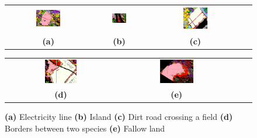 \documentclass{siamart171218}
\begin{document}
\begin{figure} [H]
    \centering
    \begin{tabular}{cccc}
        \includegraphics[width=0.3\textwidth]{images/electric_line.png} &
        \includegraphics[width=0.3\textwidth]{images/island_rejected.png} &
        \includegraphics[width=0.3\textwidth]{images/field_rejected.png} \\
        \textbf{(a)}  & \textbf{(b)} & \textbf{(c)}  \\[6pt]
    \end{tabular}
    \begin{tabular}{cccc}
        \includegraphics[width=0.3\textwidth]{images/edges.png} &
        \includegraphics[width=0.3\textwidth]{images/jachere.png} \\
        \textbf{(d)}  & \textbf{(e)}  \\[6pt]
    \end{tabular}
    \caption{ \textbf{(a)} Electricity line
    \textbf{(b)} Island
    \textbf{(c)} Dirt road crossing a field
    \textbf{(d)} Borders between two species
    \textbf{(e)} Fallow land}
    \label{visual_assessment_kmeans_pictures}
\end{figure}
\end{document}
